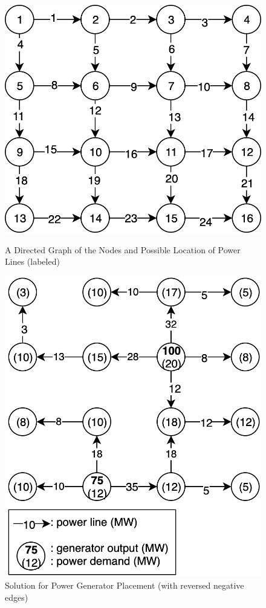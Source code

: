 \begin{figure}[h]
    \centering
    \begin{minipage}{.46\textwidth}
        \centering
        \includegraphics[width=0.9\linewidth]{hw2/hw2-prob4.png}
        \caption{A Directed Graph of the Nodes and Possible Location of Power Lines (labeled)}
        \label{fig:dag_power}
    \end{minipage}%
    \begin{minipage}{.46\textwidth}
        \centering
        \includegraphics[width=0.8\linewidth]{hw2/hw2-prob4-sol.png}
        \caption{Solution for Power Generator Placement (with reversed negative edges)}
        \label{fig:sol_power}
    \end{minipage}
\end{figure}



